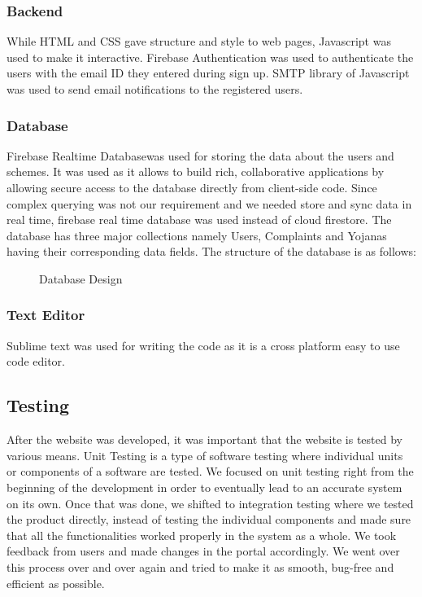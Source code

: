 \documentclass[conference]{IEEEtran}
\begin{document}
\subsubsection{Backend}
While HTML and CSS gave structure and style to web pages, Javascript\cite{b1} was used to make it interactive. Firebase Authentication was used to authenticate the users with the email ID they entered during sign up. SMTP\cite{b2} library of Javascript was used to send email notifications to the registered users. 
\subsubsection{Database}
Firebase Realtime Database\cite{b3}was used for storing the data about the users and schemes. It was used as it allows to build rich, collaborative applications by allowing secure access to the database directly from client-side code. Since complex querying was not our requirement and we needed store and sync data in real time, firebase real time database was used instead of cloud firestore. The database has three major collections namely Users, Complaints and Yojanas having their corresponding data fields. The structure of the database is as follows:
\begin{figure}[h!]
\centering
{}
\caption{Database Design}
\end{figure}
\subsubsection{Text Editor}
Sublime text was used for writing the code as it is a cross platform easy to use code editor.
\subsection{Testing}
After the website was developed, it was important
that the website is tested by various means.
Unit Testing is a type of software testing where individual units or components of a software are tested. We focused on unit testing right from the beginning of the development in order to eventually lead to an accurate system on its own. Once that was done, we shifted to integration testing where we tested the product directly, instead of testing the individual components and made sure that all the functionalities worked properly in the system as a whole. We took feedback from users and made changes in the portal accordingly. We went over this process over and over again and tried to make it as smooth, bug-free and efficient as possible.
\end{document}
